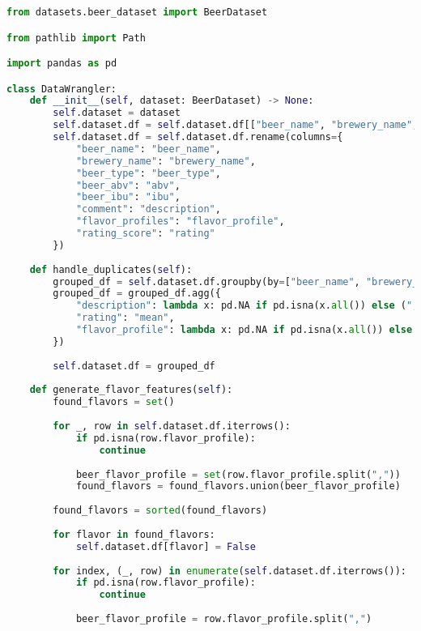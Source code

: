 \documentclass[sigconf]{acmart}
\begin{document}
\begin{lstlisting}[language=Python]
from datasets.beer_dataset import BeerDataset

from pathlib import Path

import pandas as pd

class DataWrangler:
    def __init__(self, dataset: BeerDataset) -> None:
        self.dataset = dataset
        self.dataset.df = self.dataset.df[["beer_name", "brewery_name", "beer_type", "beer_abv", "beer_ibu", "comment", "flavor_profiles", "rating_score"]]
        self.dataset.df = self.dataset.df.rename(columns={
            "beer_name": "beer_name",
            "brewery_name": "brewery_name",
            "beer_type": "beer_type",
            "beer_abv": "abv",
            "beer_ibu": "ibu",
            "comment": "description",
            "flavor_profiles": "flavor_profile",
            "rating_score": "rating"
        })
    
    def handle_duplicates(self):       
        grouped_df = self.dataset.df.groupby(by=["beer_name", "brewery_name", "beer_type", "abv", "ibu"], as_index=False)
        grouped_df = grouped_df.agg({
            "description": lambda x: pd.NA if pd.isna(x.all()) else ("; ".join(x.dropna().to_list()).replace("\n", ". ") if ("".join(x.dropna().to_list()) != "") else pd.NA),
            "rating": "mean",
            "flavor_profile": lambda x: pd.NA if pd.isna(x.all()) else ",".join(x.dropna().to_list())
        })
        
        self.dataset.df = grouped_df
    
    def generate_flavor_features(self):
        found_flavors = set()
        
        for _, row in self.dataset.df.iterrows():
            if pd.isna(row.flavor_profile):
                continue
            
            beer_flavor_profile = set(row.flavor_profile.split(","))
            found_flavors = found_flavors.union(beer_flavor_profile)
            
        found_flavors = sorted(found_flavors)
            
        for flavor in found_flavors:
            self.dataset.df[flavor] = False
            
        for index, (_, row) in enumerate(self.dataset.df.iterrows()):
            if pd.isna(row.flavor_profile):
                continue
            
            beer_flavor_profile = row.flavor_profile.split(",")
            

\end{lstlisting}
\end{document}
